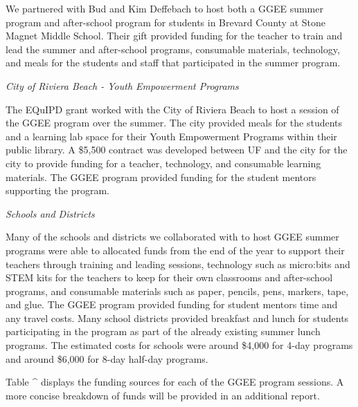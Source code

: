 \documentclass[
]{article}
\begin{document}
We partnered with Bud and Kim Deffebach to host both a GGEE summer
program and after-school program for students in Brevard County at Stone
Magnet Middle School. Their gift provided funding for the teacher to
train and lead the summer and after-school programs, consumable
materials, technology, and meals for the students and staff that
participated in the summer program.

\emph{City of Riviera Beach - Youth Empowerment Programs}

The EQuIPD grant worked with the City of Riviera Beach to host a session
of the GGEE program over the summer. The city provided meals for the
students and a learning lab space for their Youth Empowerment Programs
within their public library. A \$5,500 contract was developed between UF
and the city for the city to provide funding for a teacher, technology,
and consumable learning materials. The GGEE program provided funding for
the student mentors supporting the program.

\emph{Schools and Districts}

Many of the schools and districts we collaborated with to host GGEE
summer programs were able to allocated funds from the end of the year to
support their teachers through training and leading sessions, technology
such as micro:bits and STEM kits for the teachers to keep for their own
classrooms and after-school programs, and consumable materials such as
paper, pencils, pens, markers, tape, and glue. The GGEE program provided
funding for student mentors time and any travel costs. Many school
districts provided breakfast and lunch for students participating in the
program as part of the already existing summer lunch programs. The
estimated costs for schools were around \$4,000 for 4-day programs and
around \$6,000 for 8-day half-day programs.

Table \^{} displays the funding sources for each of the GGEE program
sessions. A more concise breakdown of funds will be provided in an
additional report.
\end{document}
